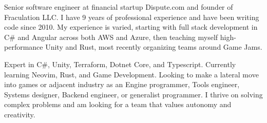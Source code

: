 

\begin{cvparagraph}

Senior software engineer at financial startup Dispute.com and founder of Fraculation LLC.\@
I have 9 years of professional experience and have been writing code since 2010. My experience is varied, starting with 
full stack development in C\# and Angular across both AWS and Azure, then teaching myself high-performance Unity and Rust,
most recently organizing teams around Game Jams.

Expert in C\#, Unity, Terraform, Dotnet Core, and Typescript. Currently learning Neovim, Rust, and Game Development. 
Looking to make a lateral move into games or adjacent industry as an Engine programmer, 
Tools engineer,  Systems designer, Backend engineer, or generalist programmer.
I thrive on solving complex problems and am looking for a team that values autonomy and creativity.

\end{cvparagraph}
